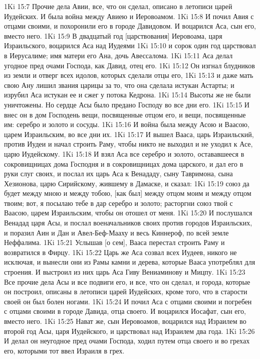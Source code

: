 1Ki 15:7  Прочие дела Авии, все, что он сделал, описано в летописи царей Иудейских. И была война между Авиею и Иеровоамом.
1Ki 15:8  И почил Авия с отцами своими, и похоронили его в городе Давидовом. И воцарился Аса, сын его, вместо него.
1Ki 15:9  В двадцатый год [царствования] Иеровоама, царя Израильского, воцарился Аса над Иудеями
1Ki 15:10  и сорок один год царствовал в Иерусалиме; имя матери его Ана, дочь Авессалома.
1Ki 15:11  Аса делал угодное пред очами Господа, как Давид, отец его.
1Ki 15:12  Он изгнал блудников из земли и отверг всех идолов, которых сделали отцы его,
1Ki 15:13  и даже мать свою Ану лишил звания царицы за то, что она сделала истукан Астарты; и изрубил Аса истукан ее и сжег у потока Кедрона.
1Ki 15:14  Высоты же не были уничтожены. Но сердце Асы было предано Господу во все дни его.
1Ki 15:15  И внес он в дом Господень вещи, посвященные отцом его, и вещи, посвященные им: серебро и золото и сосуды.
1Ki 15:16  И война была между Асою и Ваасою, царем Израильским, во все дни их.
1Ki 15:17  И вышел Вааса, царь Израильский, против Иудеи и начал строить Раму, чтобы никто не выходил и не уходил к Асе, царю Иудейскому.
1Ki 15:18  И взял Аса все серебро и золото, остававшееся в сокровищницах дома Господня и в сокровищницах дома царского, и дал его в руки слуг своих, и послал их царь Аса к Венададу, сыну Тавримона, сына Хезионова, царю Сирийскому, жившему в Дамаске, и сказал:
1Ki 15:19  союз да будет между мною и между тобою, [как был] между отцом моим и между отцом твоим; вот, я посылаю тебе в дар серебро и золото; расторгни союз твой с Ваасою, царем Израильским, чтобы он отошел от меня.
1Ki 15:20  И послушался Венадад царя Асы, и послал военачальников своих против городов Израильских, и поразил Аин и Дан и Авел-Беф-Мааху и весь Киннероф, по всей земле Неффалима.
1Ki 15:21  Услышав [о сем], Вааса перестал строить Раму и возвратился в Фирцу.
1Ki 15:22  Царь же Аса созвал всех Иудеев, никого не исключая, и вынесли они из Рамы камни и дерева, которые Вааса употреблял для строения. И выстроил из них царь Аса Гиву Вениаминову и Мицпу.
1Ki 15:23  Все прочие дела Асы и все подвиги его, и все, что он сделал, и города, которые он построил, описаны в летописи царей Иудейских, кроме того, что в старости своей он был болен ногами.
1Ki 15:24  И почил Аса с отцами своими и погребен с отцами своими в городе Давида, отца своего. И воцарился Иосафат, сын его, вместо него.
1Ki 15:25  Нават же, сын Иеровоамов, воцарился над Израилем во второй год Асы, царя Иудейского, и царствовал над Израилем два года.
1Ki 15:26  И делал он неугодное пред очами Господа, ходил путем отца своего и во грехах его, которыми тот ввел Израиля в грех.
